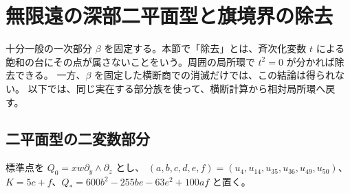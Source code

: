 \documentclass[11pt,a4paper]{ltjsarticle}
\theoremstyle{remark}
\begin{document}
\section{無限遠の深部二平面型と旗境界の除去}
\label{sec:v54-boundary}
十分一般の一次部分 $\beta$ を固定する。本節で「除去」とは、斉次化変数 $t$ による
飽和の台にその点が属さないことをいう。周囲の局所環で $t^2=0$ が分かれば除去できる。
一方、$\beta$ を固定した横断商での消滅だけでは、この結論は得られない。
以下では、同じ実在する部分族を使って、横断計算から相対局所環へ戻す。

\subsection{二平面型の二変数部分}
標準点を $Q_0=xw\partial_y\wedge\partial_z$ とし、
$(a,b,c,d,e,f)=(u_4,u_{14},u_{35},u_{36},u_{49},u_{50})$、
$K=5c+f$、$Q_*=600b^2-255be-63e^2+100af$ と置く。
\end{document}
